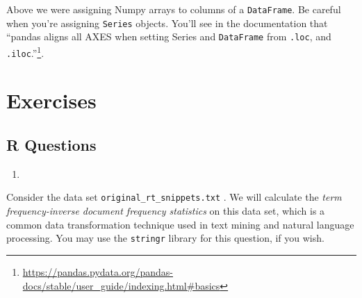 \documentclass[
  12pt,
  krantz2]{krantz}
\providecommand{\tightlist}{%
  \setlength{\itemsep}{0pt}\setlength{\parskip}{0pt}}
\renewcommand{\href}[2]{#2\footnote{\url{#1}}}
\begin{document}
Above we were assigning Numpy arrays to columns of a \texttt{DataFrame}. Be careful when you're assigning \texttt{Series} objects. You'll see in the documentation that \href{https://pandas.pydata.org/pandas-docs/stable/user_guide/indexing.html\#basics}{``pandas aligns all AXES when setting Series and \texttt{DataFrame} from \texttt{.loc}, and \texttt{.iloc}.''}.

\hypertarget{exercises-6}{%
\section{Exercises}\label{exercises-6}}

\hypertarget{r-questions-6}{%
\subsection{R Questions}\label{r-questions-6}}

\begin{enumerate}
\def\labelenumi{\arabic{enumi}.}
\tightlist
\item
\end{enumerate}

Consider the data set \texttt{original\_rt\_snippets.txt} \citep{SocherEtAl2013:RNTN}. We will calculate the \emph{term frequency-inverse document frequency statistics} \citep{Jones72astatistical} on this data set, which is a common data transformation technique used in text mining and natural language processing. You may use the \texttt{stringr} library for this question, if you wish.
\end{document}
